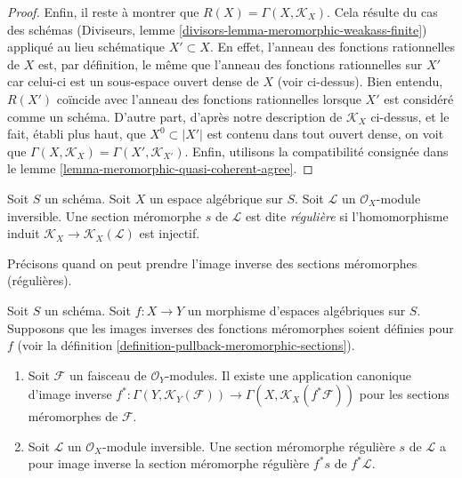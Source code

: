 \begin{proof}
\medskip\noindent
Enfin, il reste à montrer que $R(X) = \Gamma(X, \mathcal{K}_X)$.
Cela résulte du cas des schémas
(Diviseurs, lemme \ref{divisors-lemma-meromorphic-weakass-finite})
appliqué au lieu schématique $X' \subset X$.
En effet, l'anneau des fonctions rationnelles de $X$ est, par définition,
le même que l'anneau des fonctions rationnelles sur $X'$
car celui-ci est un sous-espace ouvert dense de $X$ (voir ci-dessus).
Bien entendu, $R(X')$ coïncide avec l'anneau des fonctions rationnelles
lorsque $X'$ est considéré comme un schéma.
D'autre part, d'après notre description de $\mathcal{K}_X$ ci-dessus,
et le fait, établi plus haut, que $X^0 \subset |X'|$
est contenu dans tout ouvert dense, on voit que
$\Gamma(X, \mathcal{K}_X) = \Gamma(X', \mathcal{K}_{X'})$.
Enfin, utilisons la compatibilité consignée dans le
lemme \ref{lemma-meromorphic-quasi-coherent-agree}.
\end{proof}

\begin{definition}
\label{definition-regular-meromorphic-section}
Soit $S$ un schéma.
Soit $X$ un espace algébrique sur $S$.
Soit $\mathcal{L}$ un $\mathcal{O}_X$-module inversible.
Une section méromorphe $s$ de $\mathcal{L}$ est dite {\it régulière}
si l'homomorphisme induit $\mathcal{K}_X \to \mathcal{K}_X(\mathcal{L})$
est injectif.
\end{definition}

\noindent
Précisons quand on peut prendre l'image inverse des sections méromorphes (régulières).

\begin{lemma}
\label{lemma-meromorphic-sections-pullback}
Soit $S$ un schéma.
Soit $f : X \to Y$ un morphisme d'espaces algébriques sur $S$.
Supposons que les images inverses des fonctions méromorphes soient définies
pour $f$ (voir la
définition \ref{definition-pullback-meromorphic-sections}).
\begin{enumerate}
\item Soit $\mathcal{F}$ un faisceau de $\mathcal{O}_Y$-modules.
Il existe une application canonique d'image inverse
$f^* : \Gamma(Y, \mathcal{K}_Y(\mathcal{F})) \to
\Gamma(X, \mathcal{K}_X(f^*\mathcal{F}))$
pour les sections méromorphes de $\mathcal{F}$.
\item Soit $\mathcal{L}$ un $\mathcal{O}_X$-module inversible.
Une section méromorphe régulière $s$ de $\mathcal{L}$ a pour image inverse
la section méromorphe régulière $f^*s$ de $f^*\mathcal{L}$.
\end{enumerate}
\end{lemma}


